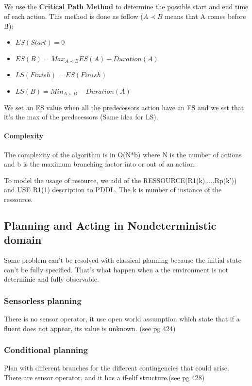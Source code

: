 \subparagraph{ } We  use the \textbf{Critical Path  Method} to determine
the possible start and  end time of each action. This  method is done as
follow ($A\prec B$ means that A comes before B):
	\begin{itemize}
		\item $ES(Start) = 0$
		\item $ES(B)=Max_{A\prec B}ES(A)+Duration(A)$
		\item $LS(Finish)=ES(Finish)$
		\item $LS(B)=Min_{A\succ B}-Duration(A)$
	\end{itemize}

We set an ES  value when all the predecessors action have  an ES and we 
set that it's the max of the predecessors (Same idea for LS).           

\paragraph{Complexity}  The complexity  of  the algorithm  is in  O(N*b)
where N is the  number of actions and b is  the maximum branching factor
into or out  of an action.

To  model the usage of resource,  we add of
the RESSOURCE(R1(k),...,Rp(k')) and USE R1(1) description to PDDL. The k
is number of instance of the ressource.

\subsection{Planning and Acting in Nondeterministic domain}
Some  problem can't  be  resolved with  classical  planning because  the
initial state  can't be fully specified.  That's what happen when  a the
environment is not determinic and fully observable.

\subsubsection{Sensorless planning}
There is  no sensor operator, it  use open world assumption  which state
that if  a fluent does  not appear, its value  is unknown. (see  pg 424)

\subsubsection{Conditional planning}
Plan with different branches for  the different contingencies that could
arise. There are sensor operator, and it has a if-elif structure.(see pg
428)

